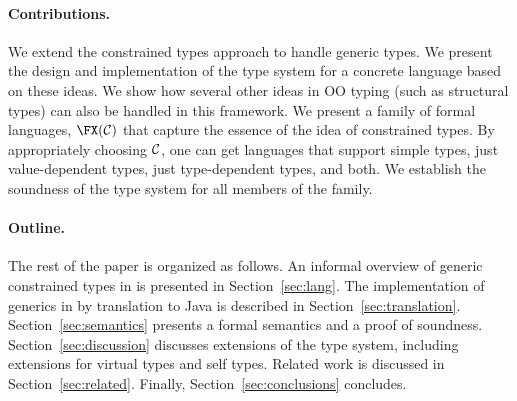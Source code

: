 \paragraph{Contributions.}
We extend the constrained types approach to handle generic types.  We
present the design and implementation of the type system for a
concrete language \Xten{} based on these ideas. We show how several
other ideas in OO typing (such as structural types) can also be
handled in this framework. We present a family of formal languages,
$\FX(\cal C)$ that capture the essence of the idea of constrained
types. By appropriately choosing $\cal C$, one can get languages that
support simple types, just value-dependent types, just type-dependent
types, and both. We establish the soundness of the type system for all
members of the family.

\paragraph{Outline.}

The rest of the paper is organized as follows.
%
An informal overview of generic constrained types in \Xten{}
is presented in
Section~\ref{sec:lang}.  The implementation of generics in \Xten{} by translation to Java is described in 
Section~\ref{sec:translation}.
%
Section~\ref{sec:semantics} presents a formal semantics and a
proof of soundness.
%
Section~\ref{sec:discussion} discusses extensions of the type system,
including extensions for virtual types and self types.
%
Related work is discussed in Section~\ref{sec:related}.
%
Finally, Section~\ref{sec:conclusions} concludes.


